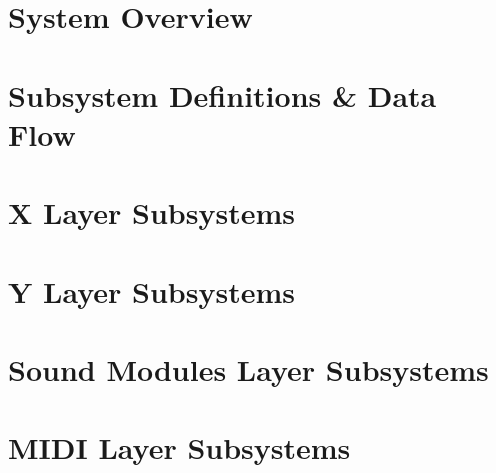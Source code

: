 \documentclass[11pt,letterpaper]{article}
\begin{document}
\section{System Overview}

\newpage
\section{Subsystem Definitions \& Data Flow}

\newpage
\section{X Layer Subsystems}

\newpage
\section{Y Layer Subsystems}

\newpage
\section{Sound Modules Layer Subsystems}

\newpage
\section{MIDI Layer Subsystems}

\newpage



{}
\end{document}
